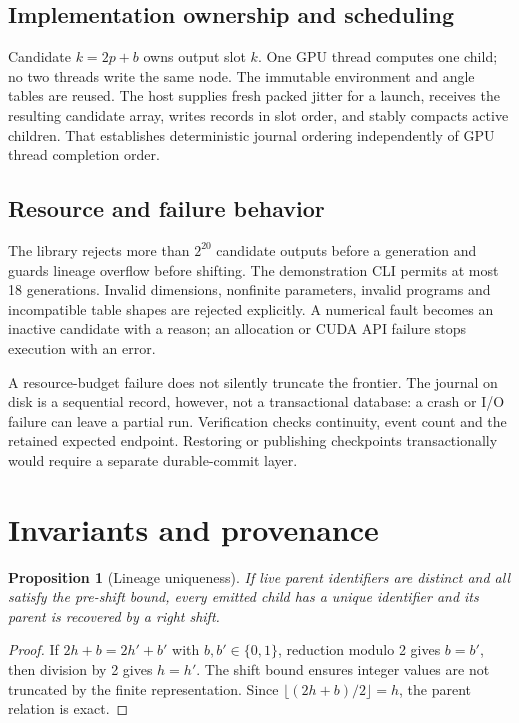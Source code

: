 \documentclass[11pt,a4paper]{article}
\newtheorem{proposition}[theorem]{Proposition}
\begin{document}
\subsection{Implementation ownership and scheduling}
Candidate $k=2p+b$ owns output slot $k$. One GPU thread computes one child; no two threads write the same node. The immutable environment and angle tables are reused. The host supplies fresh packed jitter for a launch, receives the resulting candidate array, writes records in slot order, and stably compacts active children. That establishes deterministic journal ordering independently of GPU thread completion order.

\subsection{Resource and failure behavior}
The library rejects more than $2^{20}$ candidate outputs before a generation and guards lineage overflow before shifting. The demonstration CLI permits at most 18 generations. Invalid dimensions, nonfinite parameters, invalid programs and incompatible table shapes are rejected explicitly. A numerical fault becomes an inactive candidate with a reason; an allocation or CUDA API failure stops execution with an error.

A resource-budget failure does not silently truncate the frontier. The journal on disk is a sequential record, however, not a transactional database: a crash or I/O failure can leave a partial run. Verification checks continuity, event count and the retained expected endpoint. Restoring or publishing checkpoints transactionally would require a separate durable-commit layer.
\clearpage

\section{Invariants and provenance}
\begin{proposition}[Lineage uniqueness]
If live parent identifiers are distinct and all satisfy the pre-shift bound, every emitted child has a unique identifier and its parent is recovered by a right shift.
\end{proposition}
\begin{proof}
If $2h+b=2h'+b'$ with $b,b'\in\{0,1\}$, reduction modulo 2 gives $b=b'$, then division by 2 gives $h=h'$. The shift bound ensures integer values are not truncated by the finite representation. Since $\lfloor(2h+b)/2\rfloor=h$, the parent relation is exact.
\end{proof}
\end{document}
